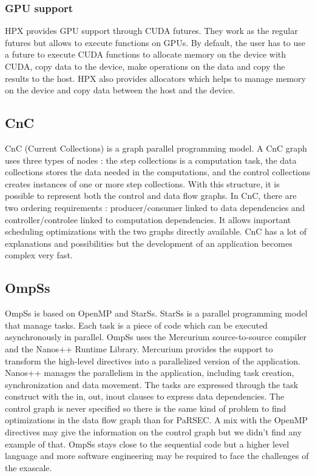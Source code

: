 \subsubsection{GPU support}
HPX provides GPU support through CUDA futures.
They work as the regular futures but allows to execute functions on GPUs.
By default, the user has to use a future to execute CUDA functions to allocate memory on the device with CUDA, copy data to the device, make operations on the data and copy the results to the host.
HPX also provides allocators which helps to manage memory on the device and copy data between the host and the device.


\subsection{CnC}
CnC \cite{ChaKV2010} \cite{BBCKL2010} (Current Collections) is a graph parallel programming model.
A CnC graph uses three types of nodes : the step collections is a computation task, the data collections stores the data needed in the computations, and the control collections creates instances of one or more step collections.
With this structure, it is possible to represent both the control and data flow graphs.
In CnC, there are two ordering requirements : producer/consumer linked to data dependencies and controller/controlee linked to computation dependencies.
It allows important scheduling optimizations with the two graphs directly available.
CnC has a lot of explanations and possibilities but the development of an application becomes complex very fast.

\subsection{OmpSs}
OmpSs \cite{DABLM2011} is based on OpenMP \cite{DaguM1998} and StarSs.
StarSs is a parallel programming model that manage tasks.
Each task is a piece of code which can be executed asynchronously in parallel.
OmpSs uses the Mercurium source-to-source compiler and the Nanos++ Runtime Library.
Mercurium provides the support to transform the high-level directives into a parallelized version of the application.
Nanos++ manages the parallelism in the application, including task creation, synchronization and data movement.
The tasks are expressed through the task construct with the in, out, inout clauses to express data dependencies.
The control graph is never specified so there is the same kind of problem to find optimizations in the data flow graph than for PaRSEC.
A mix with the OpenMP directives may give the information on the control graph but we didn't find any example of that.
OmpSs stays close to the sequential code but a higher level language and more software engineering may be required to face the challenges of the exascale.

